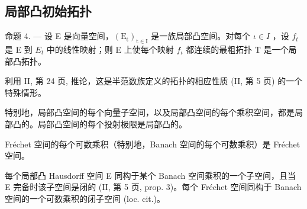 \subsection{局部凸初始拓扑}

命题 4. --- 设 E 是向量空间，\((\mathrm{E}_{\mathrm{t}})_{\mathrm{t}\in\mathrm{I}}\) 是一族局部凸空间。对每个 \(\iota\in I\) ，设 \(f_{t}\) 是 E 到 \(E_{t}\) 中的线性映射；则 E 上使每个映射 \(f_{\iota}\) 都连续的最粗拓扑 T 是一个局部凸拓扑。

利用 II, 第 24 页, 推论，这是半范数族定义的拓扑的相应性质 (II, 第 5 页) 的一个特殊情形。

特别地，局部凸空间的每个向量子空间，以及局部凸空间的每个乘积空间，都是局部凸的。局部凸空间的每个投射极限是局部凸的。

Fréchet 空间的每个可数乘积（特别地，Banach 空间的每个可数乘积）是 Fréchet 空间。

每个局部凸 Hausdorff 空间 E 同构于某个 Banach 空间乘积的一个子空间，且当 E 完备时该子空间是闭的 (II, 第 5 页, prop. 3)。每个 Fréchet 空间同构于 Banach 空间的一个可数乘积的闭子空间 (loc. cit.)。

